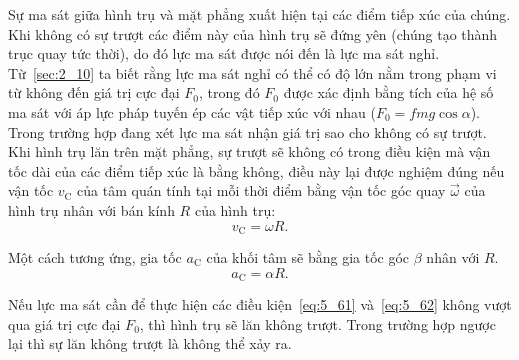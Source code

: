 Sự ma sát giữa hình trụ và mặt phẳng xuất hiện tại các điểm tiếp xúc của chúng. Khi không có sự trượt các điểm này của hình trụ sẽ đứng yên (chúng tạo thành trục quay tức thời), do đó lực ma sát được nói đến là lực ma sát nghỉ. Từ~\ref{sec:2_10} ta biết rằng lực ma sát nghỉ có thể có độ lớn nằm trong phạm vi từ không đến giá trị cực đại $F_0$, trong đó $F_0$ được xác định bằng tích của hệ số ma sát với áp lực pháp tuyến ép các vật tiếp xúc với nhau ($F_0=fmg\cos\alpha$). Trong trường hợp đang xét lực ma sát nhận giá trị sao cho không có sự trượt. Khi hình trụ lăn trên mặt phẳng, sự trượt sẽ không có trong điều kiện mà vận tốc dài của các điểm tiếp xúc là bằng không, điều này lại được nghiệm đúng nếu vận tốc $v_{\text{C}}$ của tâm quán tính tại mỗi thời điểm bằng vận tốc góc quay $\vec{\omega}$ của hình trụ nhân với bán kính $R$ của hình trụ:
\begin{equation}\label{eq:5_61}
	v_{\text{C}} = \omega R.
\end{equation}

\noindent
Một cách tương ứng, gia tốc $a_{\text{C}}$ của khối tâm sẽ bằng gia tốc góc $\beta$ nhân với $R$.
\begin{equation}\label{eq:5_62}
	a_{\text{C}} = \alpha R.
\end{equation}

Nếu lực ma sát cần để thực hiện các điều kiện~\eqref{eq:5_61} và~\eqref{eq:5_62} không vượt qua giá trị cực đại $F_0$, thì hình trụ sẽ lăn không trượt. Trong trường hợp ngược lại thì sự lăn không trượt là không thể xảy ra.

